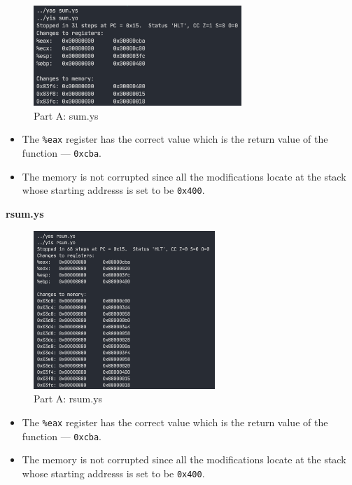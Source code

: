 \documentclass[12pt,a4paper]{article}
\begin{document}
\begin{figure}[H] %
        \centering %
        \includegraphics[width=0.7\textwidth]{partA-sum-bz.png} %
        \caption{Part A: sum.ys} %
        \label{Fig.partA-sum} %
\end{figure}
\begin{itemize}
        \item The \texttt{\%eax} register has the correct value which is the return value of the function --- \texttt{0xcba}.
        \item The memory is not corrupted since all the modifications locate at the stack whose starting addresss is set to be \texttt{0x400}.
\end{itemize}
\textbf{rsum.ys}\\

\begin{figure}[H] %
        \centering %
        \includegraphics[width=0.61\textwidth]{partA-rsum-bz.png} %
        \caption{Part A: rsum.ys} %
        \label{Fig.partA-rsum} %
\end{figure}

\begin{itemize}
        \item The \texttt{\%eax} register has the correct value which is the return value of the function --- \texttt{0xcba}.
        \item The memory is not corrupted since all the modifications locate at the stack whose starting addresss is set to be \texttt{0x400}.
\end{itemize}
\end{document}
